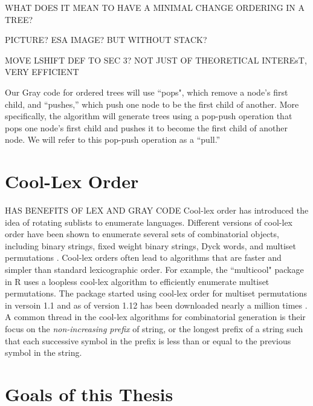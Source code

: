 WHAT DOES IT MEAN TO HAVE A MINIMAL CHANGE ORDERING IN A TREE?

PICTURE? ESA IMAGE? BUT WITHOUT STACK?

MOVE LSHIFT DEF TO SEC 3?
NOT JUST OF THEORETICAL INTEREsT, VERY EFFICIENT


Our Gray code for ordered trees will use ``pops", which remove a node's first child, and ``pushes,'' which push one node to be the first child of another.  More specifically, the algorithm will generate trees using a pop-push operation that pops one node's first child and pushes it to become the first child of another node.  We will refer to this pop-push operation as a ``pull.''


\section{Cool-Lex Order}

HAS BENEFITS OF LEX AND GRAY CODE
Cool-lex order has introduced the idea of rotating sublists to enumerate languages.  Different versions of cool-lex order have been shown to enumerate several sets of combinatorial objects, including binary strings, fixed weight binary strings, Dyck words, and multiset permutations \cite{williams2009shift}.  Cool-lex orders often lead to algorithms that are faster and simpler than standard lexicographic order.  For example, the ``multicool" package in R uses a loopless cool-lex algorithm to efficiently enumerate multiset permutations.   The package started using cool-lex order for multiset permutations in versoin 1.1 and as of version 1.12 has been downloaded nearly a million times \cite{multicool_2021}.  A common thread in the cool-lex algorithms for combinatorial generation is their focus on the \emph{non-increasing prefix} of string, or the longest prefix of a string such that each successive symbol in the prefix is less than or equal to the previous symbol in the string.

\section{Goals of this Thesis}



